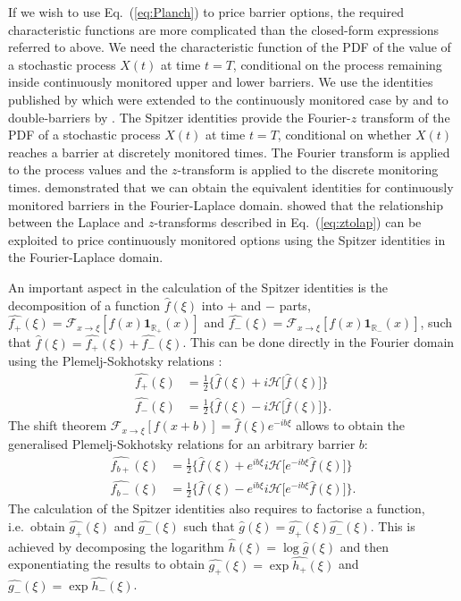 \documentclass[11pt,a4paper]{article}
\begin{document}
If we wish to use Eq.~(\ref{eq:Planch}) to price barrier options, the required characteristic functions are more complicated than the closed-form expressions referred to above. We need the characteristic function of the PDF of the value of a stochastic process $X(t)$ at time $t=T$, conditional on the process remaining inside continuously monitored upper and lower barriers. We use the identities published by \cite{spitzer1956combinatorial} which were extended to the continuously monitored case by \cite{baxter1957distribution} and to double-barriers by \cite{Kemperman1963}. The Spitzer identities provide the Fourier-$z$ transform of the PDF of a stochastic process $X(t)$ at time $t=T$, conditional on whether $X(t)$ reaches a barrier at discretely monitored times. The Fourier transform is applied to the process values and the $z$-transform is applied to the discrete monitoring times.
\cite{baxter1957distribution} demonstrated that we can obtain the equivalent identities for continuously monitored barriers in the Fourier-Laplace domain. \cite{Green2010} showed that the relationship between the Laplace and $z$-transforms described in Eq.~(\ref{eq:ztolap}) can be exploited to price continuously monitored options using the Spitzer identities in the Fourier-Laplace domain.

An important aspect in the calculation of the Spitzer identities is the decomposition of a function $\widehat{f}(\xi)$ into $+$ and $-$ parts, $\widehat{f_+}(\xi)=\mathcal{F}_{x\rightarrow\xi}\left[f(x)\mathbf{1}_{\mathbb{R}_+}(x)\right]$ and $\widehat{f_-}(\xi)=\mathcal{F}_{x\rightarrow\xi}\left[f(x)\mathbf{1}_{\mathbb{R}_-}(x)\right]$, such that $\widehat{f}(\xi) = \widehat{f_+}(\xi) + \widehat{f_-}(\xi)$.
This can be done directly in the Fourier domain using the Plemelj-Sokhotsky relations \citep{King2009,Fusai2016}:
\begin{align}
\label{eq:PSRel}
\widehat{f_+}(\xi)&=\frac{1}{2}\big\{\widehat{f}(\xi)+i\mathcal{H}\big[\widehat{f}(\xi)\big]\big\}\\
\widehat{f_-}(\xi)&=\frac{1}{2}\big\{\widehat{f}(\xi)-i\mathcal{H}\big[\widehat{f}(\xi)\big]\big\}.
\end{align}
The shift theorem $\mathcal{F}_{x\rightarrow\xi}[f(x+b)]=\widehat{f}(\xi)e^{-ib\xi}$ allows to obtain the generalised Plemelj-Sokhotsky relations for an arbitrary barrier $b$:
\begin{align}
\widehat{f_{b+}}(\xi)&=\frac{1}{2}\big\{\widehat{f}(\xi)+e^{ib\xi}i\mathcal{H}\big[e^{-ib\xi}\widehat{f}(\xi)\big]\big\}\label{eq:PSRelgenpos}\\
\widehat{f_{b-}}(\xi)&=\frac{1}{2}\big\{\widehat{f}(\xi)-e^{ib\xi}i\mathcal{H}\big[e^{-ib\xi}\widehat{f}(\xi)\big]\big\}.\label{eq:PSRelgenneg}
\end{align}
The calculation of the Spitzer identities also requires to factorise a function, i.e.~obtain $\widehat{g_+}(\xi)$ and $\widehat{g_-}(\xi)$ such that $\widehat{g}(\xi)=\widehat{g_+}(\xi)\widehat{g_-}(\xi)$. This is achieved by decomposing the logarithm $\widehat{h}(\xi)=\log\widehat{g}(\xi)$ and then exponentiating the results to obtain $\widehat{g_+}(\xi)=\exp\widehat{h_+}(\xi)$ and $\widehat{g_-}(\xi)=\exp\widehat{h_-}(\xi)$.
\end{document}
